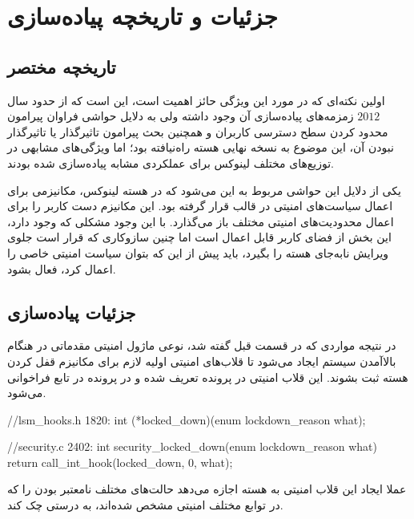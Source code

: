 \vspace{-1cm}
\section*{جزئیات و تاریخچه پیاده‌سازی}
\vspace{-0.2cm}
\vspace{-0.4cm}
\subsection*{تاریخچه مختصر}
\vspace{-0.15cm}
اولین نکته‌ای که در مورد این ویژگی حائز اهمیت است، این است که از حدود سال $2012$ زمزمه‌های پیاده‌سازی آن وجود داشته ولی به دلایل حواشی فراوان پیرامون محدود کردن سطح دسترسی کاربران و همچنین بحث پیرامون تاثیرگذار یا تاثیرگذار نبودن آن، این موضوع به نسخه نهایی هسته راه‌نیافته بود؛ اما ویژگی‌های مشابهی در توزیع‌های مختلف لینوکس برای عملکردی مشابه پیاده‌سازی شده بودند.
\cite{LWN2}

یکی از دلایل این حواشی مربوط به این می‌شود که در هسته لینوکس، مکانیزمی برای اعمال سیاست‌های امنیتی در قالب 
قرار گرفته بود. این مکانیزم دست کاربر را برای اعمال محدودیت‌های امنیتی مختلف باز می‌گذارد. با این وجود مشکلی که وجود دارد، این بخش از فضای کاربر قابل اعمال است اما چنین سازوکاری که قرار است جلوی ویرایش نابه‌جای هسته را بگیرد، باید پیش از این که بتوان سیاست امنیتی خاصی را اعمال کرد، فعال بشود.
\vspace{-0.9cm}
\subsection*{جزئیات پیاده‌سازی }
\vspace{-0.35cm}
در نتیجه مواردی که در قسمت قبل گفته شد، نوعی ماژول امنیتی مقدماتی در هنگام بالاآمدن
سیستم ایجاد می‌شود تا قلاب‌های امنیتی
اولیه لازم برای مکانیزم قفل کردن هسته ثبت بشوند. این قلاب امنیتی در پرونده 
تعریف شده و در پرونده 
در تابع 
فراخوانی می‌شود.
\vspace{0.1cm}
\begin{code}
//lsm_hooks.h
1820: int (*locked_down)(enum lockdown_reason what);
	
//security.c	
2402: int security_locked_down(enum lockdown_reason what)
{
	return call_int_hook(locked_down, 0, what);
}
\end{code}

عملا ایجاد این قلاب امنیتی به هسته اجازه می‌دهد حالت‌های مختلف نامعتبر بودن را که در توابع مختلف امنیتی مشخص شده‌اند، به درستی چک کند.

